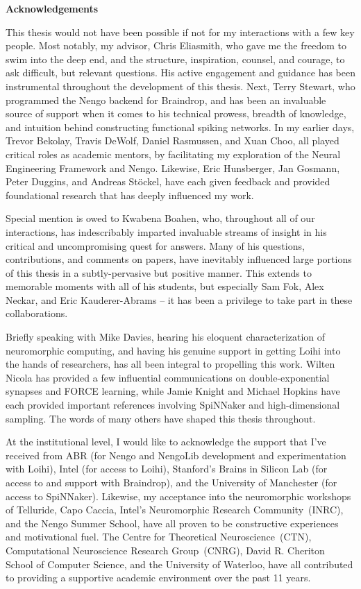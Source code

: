{}
\begin{center}\textbf{Acknowledgements}\end{center}

This thesis would not have been possible if not for my interactions with a few key people.
Most notably, my advisor, Chris Eliasmith, who gave me the freedom to swim into the deep end, and the structure, inspiration, counsel, and courage, to ask difficult, but relevant questions.
His active engagement and guidance has been instrumental throughout the development of this thesis.
Next, Terry Stewart, who programmed the Nengo backend for Braindrop, and has been an invaluable source of support when it comes to his technical prowess, breadth of knowledge, and intuition behind constructing functional spiking networks.
In my earlier days, Trevor Bekolay, Travis DeWolf, Daniel Rasmussen, and Xuan Choo, all played critical roles as academic mentors, by facilitating my exploration of the Neural Engineering Framework and Nengo.
Likewise, Eric Hunsberger, Jan Gosmann, Peter Duggins, and Andreas St{\"o}ckel, have each given feedback and provided foundational research that has deeply influenced my work.

Special mention is owed to Kwabena Boahen, who, throughout all of our interactions, has indescribably imparted invaluable streams of insight in his critical and uncompromising quest for answers.
Many of his questions, contributions, and comments on papers, have inevitably influenced large portions of this thesis in a subtly-pervasive but positive manner.
This extends to memorable moments with all of his students, but especially Sam Fok, Alex Neckar, and Eric Kauderer-Abrams -- it has been a privilege to take part in these collaborations.

Briefly speaking with Mike Davies, hearing his eloquent characterization of neuromorphic computing, and having his genuine support in getting Loihi into the hands of researchers, has all been integral to propelling this work.
Wilten Nicola has provided a few influential communications on double-exponential synapses and FORCE learning, while Jamie Knight and Michael Hopkins have each provided important references involving SpiNNaker and high-dimensional sampling.
The words of many others have shaped this thesis throughout.

At the institutional level, I would like to acknowledge the support that I've received from
ABR (for Nengo and NengoLib development and experimentation with Loihi),
Intel (for access to Loihi),
Stanford's Brains in Silicon Lab (for access to and support with Braindrop),
and the University of Manchester (for access to SpiNNaker).
Likewise, my acceptance into the neuromorphic workshops of Telluride, Capo Caccia, Intel's Neuromorphic Research Community~(INRC), and the Nengo Summer School, have all proven to be constructive experiences and motivational fuel.
The Centre for Theoretical Neuroscience~(CTN), Computational Neuroscience Research Group~(CNRG), David R. Cheriton School of Computer Science, and the University of Waterloo, have all contributed to providing a supportive academic environment over the past 11 years.  

